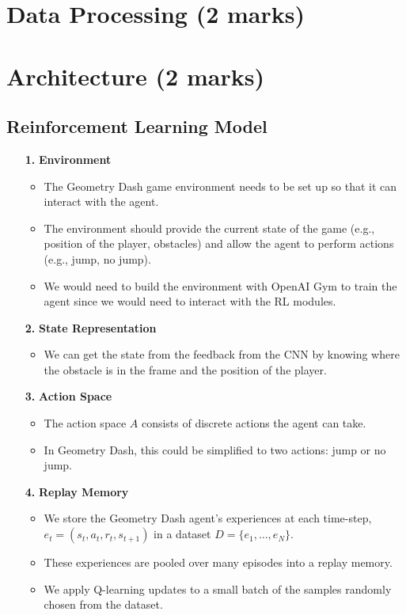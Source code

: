 \documentclass{article} %
\begin{document}
\section{Data Processing (2 marks)}

\section{Architecture (2 marks)}
\subsection*{Reinforcement Learning Model}

\begin{itemize}
    \item[\textbf{1.}] \textbf{Environment}
    \begin{itemize}
        \item The Geometry Dash game environment needs to be set up so that it can interact with the agent. 
        \item The environment should provide the current state of the game (e.g., position of the player, obstacles) and allow the agent to perform actions (e.g., jump, no jump).
        \item We would need to build the environment with OpenAI Gym to train the agent since we would need to interact with the RL modules.
    \end{itemize}

    \item[\textbf{2.}] \textbf{State Representation}
    \begin{itemize}
        \item We can get the state from the feedback from the CNN by knowing where the obstacle is in the frame and the position of the player.
    \end{itemize}

    \item[\textbf{3.}] \textbf{Action Space}
    \begin{itemize}
        \item The action space \( A \) consists of discrete actions the agent can take. 
        \item In Geometry Dash, this could be simplified to two actions: jump or no jump.
    \end{itemize}

    \item[\textbf{4.}] \textbf{Replay Memory}
    \begin{itemize}
        \item We store the Geometry Dash agent’s experiences at each time-step, \( e_t = (s_t, a_t, r_t, s_{t+1}) \) in a dataset \( D = \{e_1, \ldots, e_N\} \).
        \item These experiences are pooled over many episodes into a replay memory.
        \item We apply Q-learning updates to a small batch of the samples randomly chosen from the dataset.
    \end{itemize}


\end{itemize}
\end{document}
